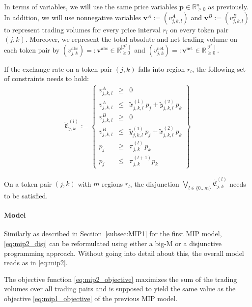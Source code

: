 \documentclass[11pt,parskip=full]{scrartcl}%
\newcommand*{\itokenpairs}{\mathcal{I}^p}   %
\newcommand*{\subsecref}[1]{\hyperref[{#1}]{Section~\ref*{#1}}}
\begin{document}
In terms of variables, we will use the same price variables $\mathbf{p} \in \mathbb{R}^n_{\ge 0}$
as previously.
In addition, we will use nonnegative variables
$\mathbf{v}^A := (v^A_{j,k,l})$ and $\mathbf{v}^B := (v^B_{j,k,l})$
to represent trading volumes for every price interval $r_l$ on every token pair $(j,k)$.
Moreover, we represent the total absolute and net trading volume on each token pair by
$(v_{j,k}^\mathrm{abs}) =: \mathbf{v}^\mathrm{abs} \in \mathbb{R}_{\ge 0}^{\mid \itokenpairs \mid}$
and
$(v_{j,k}^\mathrm{net}) =: \mathbf{v}^\mathrm{net} \in \mathbb{R}_{\ge 0}^{\mid \itokenpairs \mid}$.

\newpage
If the exchange rate on a token pair $(j,k)$ falls into region $r_l$, the following set of
constraints needs to hold:
\begin{align}
  \tilde{\mathfrak{C}}^{(l)}_{j,k} := \left\{
  \begin{array}{rll}
    v^A_{j,k,l}
      &\ge & 0
    \\[2mm]
    v^A_{j,k,l}
      &\le & \tilde{x}_{j,k,l}^{(1)} \, p_j + \tilde{y}_{j,k,l}^{(2)} \, p_k
    \\[4mm]
    v^B_{j,k,l}
      &\ge & 0
    \\[2mm]
    v^B_{j,k,l}
      &\le & \tilde{y}_{j,k,l}^{(1)} \, p_j + \tilde{x}_{j,k,l}^{(2)} \, p_k
    \\[4mm]
    p_j & \ge & \pi_{j,k}^{(l)} \, p_k \\[2mm]
    p_j & \le & \pi_{j,k}^{(l+1)} p_k
  \end{array}
  \right\}
  \label{eq:mip2_disj}
\end{align}

On a token pair $(j,k)$ with $m$ regions $r_l$, the disjunction
$\bigvee\limits_{l \in \{0 \ldots m\}} \tilde{\mathfrak{C}}^{(l)}_{j,k}$
needs to be satisfied.

\paragraph{Model}

Similarly as described in \subsecref{subsec:MIP1} for the first MIP model, \eqref{eq:mip2_disj} can
be reformulated using either a big-M or a disjunctive programming approach.
Without going into detail about this, the overall model reads as in \eqref{eq:mip2}.

The objective function \eqref{eq:mip2_objective} maximizes the sum of the trading volumes over all
trading pairs and is supposed to yield the same value as the objective \eqref{eq:mip1_objective} of
the previous MIP model.
\end{document}
